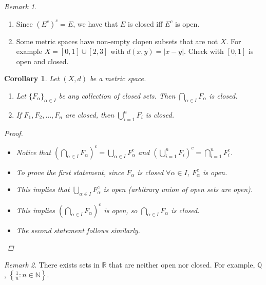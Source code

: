 \documentclass[10pt]{article}
\newcommand{\N}{\mathbb{N}}
\newcommand{\R}{\mathbb{R}}
\newcommand{\Q}{\mathbb{Q}}
\newtheorem{corollary}[theorem]{Corollary}
\theoremstyle{definition}
\theoremstyle{remark}
\newtheorem*{remark}{Remark}
\begin{document}
\begin{remark}
    \hfill
    \begin{enumerate}
        \item Since $(E^c)^c = E$, we have that $E$ is closed iff $E^c$ is open.
        \item Some metric spaces have non-empty clopen subsets that are not $X$. For example $X = [0, 1] \cup [2, 3]$ with $d(x, y) = |x - y|$. Check with $[0, 1]$ is open and closed.
    \end{enumerate}
\end{remark}

\begin{corollary}
    Let $(X, d)$ be a metric space.
    \begin{enumerate}
        \item Let $\{F_\alpha\}_{\alpha \in I}$ be any collection of closed sets. Then $\bigcap_{\alpha \in I} F_\alpha$ is closed.
        \item If $F_1, F_2, \ldots, F_n$ are closed, then $\bigcup_{i=1}^n F_i$ is closed.
    \end{enumerate}
    \begin{proof}
        \hfill
        \begin{itemize}
            \item
        Notice that $\left(\bigcap_{\alpha \in I} F_\alpha\right)^c = \bigcup_{\alpha \in I} F_\alpha^c$ and $\left(\bigcup_{i=1}^n F_i\right)^c = \bigcap_{i=1}^n F_i^c$.
            \item
        To prove the first statement, since $F_\alpha$ is closed $\forall \alpha \in I$, $F_\alpha^c$ is open.
            \item
        This implies that $\bigcup_{\alpha \in I} F_\alpha^c$ is open (arbitrary union of open sets are open).
            \item
        This implies $\left(\bigcap_{\alpha \in I} F_\alpha\right)^c$ is open, so $\bigcap_{\alpha \in I} F_\alpha$ is closed.
            \item
        The second statement follows similarly.
        \end{itemize}
        
    \end{proof}
\end{corollary}

\begin{remark}
    There exists sets in $\R$ that are neither open nor closed. For example, $\Q$, $\left\{\frac{1}{n} \colon n \in \N\right\}$.
\end{remark}
\end{document}
